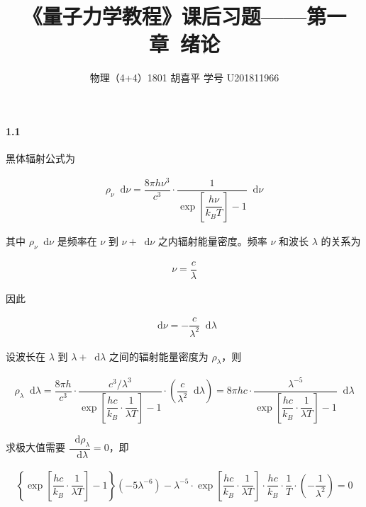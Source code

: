 \documentclass{article}
\author{物理（4+4）1801 \quad 胡喜平 \quad 学号 U201811966}
\affil{网站 https://hxp.plus/ \quad 邮件 hxp201406@gmail.com}
\title{《量子力学教程》课后习题——第一章\ 绪论}
\newcommand*{\md}{\mathop{}\!\mathrm{d}}
\begin{document}
\maketitle\thispagestyle{fancy}

\paragraph{1.1}

黑体辐射公式为

\begin{equation*}
  \begin{aligned}
    \rho_{\nu} \md \nu = \dfrac{8 \pi h \nu^3}{c^3} \cdot \dfrac{1}{\exp \left[\dfrac{h \nu}{k_B T} \right] - 1} \md \nu  
  \end{aligned}
\end{equation*}

其中 $\rho_{\nu} \md \nu$ 是频率在 $\nu$ 到 $\nu + \md \nu$ 之内辐射能量密度。频率 $\nu$ 和波长 $\lambda$ 的关系为

\begin{equation*}
  \begin{aligned}
    \nu = \dfrac{c}{\lambda} 
  \end{aligned}
\end{equation*}

因此

\begin{equation*}
  \begin{aligned}
    \md \nu = - \dfrac{c}{\lambda^2} \md \lambda 
  \end{aligned}
\end{equation*}

设波长在 $\lambda$ 到 $\lambda + \md \lambda$ 之间的辐射能量密度为 $\rho_{\lambda}$，则

\begin{equation*}
  \begin{aligned}
    \rho_{\lambda} \md \lambda = \dfrac{8 \pi h}{c^3} \cdot \dfrac{c^3 / \lambda ^3}{\exp \left[ \dfrac{h c}{k_B} \cdot \dfrac{1}{\lambda T}   \right] - 1} \cdot \left( \dfrac{c}{\lambda^2} \md \lambda  \right)
    = 8 \pi h c \cdot \dfrac{\lambda^{-5}}{\exp \left[ \dfrac{h c}{k_B} \cdot \dfrac{1}{\lambda T}   \right] - 1 } \md \lambda 
  \end{aligned}
\end{equation*}

求极大值需要 $\dfrac{\md \rho_{\lambda}}{\md \lambda} = 0 $，即

\begin{equation*}
  \begin{aligned}
    \left\{ \exp \left[ \dfrac{hc}{k_B} \cdot \dfrac{1}{\lambda T}   \right] - 1 \right\} \left( - 5 \lambda^{-6} \right) - \lambda^{-5} \cdot \exp \left[ \dfrac{hc}{k_B} \cdot \dfrac{1}{\lambda T}   \right] \cdot \dfrac{hc}{k_B} \cdot \dfrac{1}{T} \cdot \left( - \dfrac{1}{\lambda^2}  \right) = 0
  \end{aligned}
\end{equation*}
\end{document}
